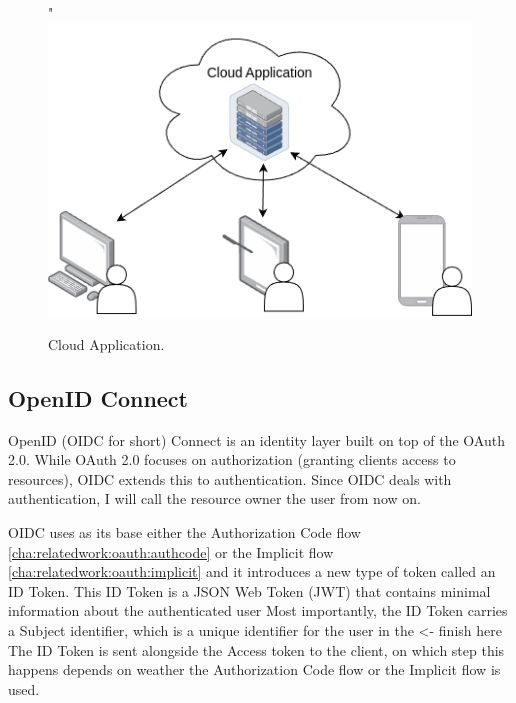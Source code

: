 \begin{figure}[H]
	\centering"
	\includegraphics[scale=0.4]{images/basic-cloud-services.drawio.png}
	\caption{Cloud Application.}
	\label{fig:oauth:authcodeflow}
\end{figure}

\subsection{OpenID Connect}
\label{cha:relatedwork:oauth:openid}


OpenID (OIDC for short) Connect is an identity layer built on top of the OAuth 2.0.
While OAuth 2.0 focuses on authorization (granting clients access to resources),
OIDC extends this to authentication.
Since OIDC deals with authentication, I will call the resource owner the user from now on.

OIDC uses as its base either the Authorization Code flow
\ref{cha:relatedwork:oauth:authcode} or the Implicit flow
\ref{cha:relatedwork:oauth:implicit} and
it introduces a new type of token called an ID Token.
This ID Token is a JSON Web Token (JWT) that contains minimal information about the authenticated
user
Most importantly, the ID Token carries a Subject identifier, which is a unique identifier
for the user in the <- finish here
The ID Token is sent alongside the Access token to the client, on which step this happens
depends on weather the Authorization Code flow or the Implicit flow is used.


%

